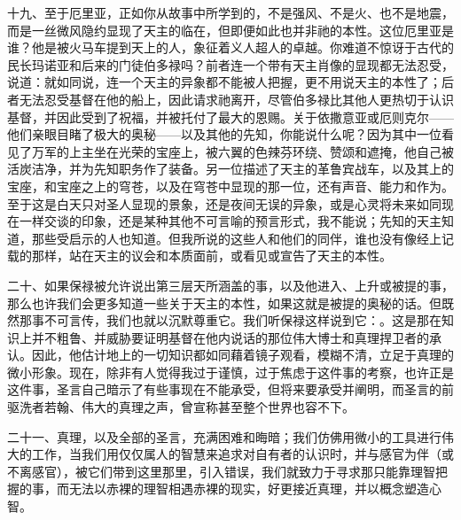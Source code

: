 十九、至于厄里亚，正如你从故事中所学到的，不是强风、不是火、也不是地震，而是一丝微风隐约显现了天主的临在，但即便如此也并非祂的本性。这位厄里亚是谁？他是被火马车提到天上的人，象征着义人超人的卓越。你难道不惊讶于古代的民长玛诺亚和后来的门徒伯多禄吗？前者连一个带有天主肖像的显现都无法忍受，说道：就如同说，连一个天主的异象都不能被人把握，更不用说天主的本性了；后者无法忍受基督在他的船上，因此请求祂离开，尽管伯多禄比其他人更热切于认识基督，并因此受到了祝福，并被托付了最大的恩赐。关于依撒意亚或厄则克尔——他们亲眼目睹了极大的奥秘——以及其他的先知，你能说什么呢？因为其中一位看见了万军的上主坐在光荣的宝座上，被六翼的色辣芬环绕、赞颂和遮掩，他自己被活炭洁净，并为先知职务作了装备。另一位描述了天主的革鲁宾战车，以及其上的宝座，和宝座之上的穹苍，以及在穹苍中显现的那一位，还有声音、能力和作为。至于这是白天只对圣人显现的景象，还是夜间无误的异象，或是心灵将未来如同现在一样交谈的印象，还是某种其他不可言喻的预言形式，我不能说；先知的天主知道，那些受启示的人也知道。但我所说的这些人和他们的同伴，谁也没有像经上记载的那样，站在天主的议会和本质面前，或看见或宣告了天主的本性。\par

二十、如果保禄被允许说出第三层天所涵盖的事，以及他进入、上升或被提的事，那么也许我们会更多知道一些关于天主的本性，如果这就是被提的奥秘的话。但既然那事不可言传，我们也就以沉默尊重它。我们听保禄这样说到它：。这是那在知识上并不粗鲁、并威胁要证明基督在他内说话的那位伟大博士和真理捍卫者的承认。因此，他估计地上的一切知识都如同藉着镜子观看，模糊不清，立足于真理的微小形象。现在，除非有人觉得我过于谨慎，过于焦虑于这件事的考察，也许正是这件事，圣言自己暗示了有些事现在不能承受，但将来要承受并阐明，而圣言的前驱洗者若翰、伟大的真理之声，曾宣称甚至整个世界也容不下。\par

二十一、真理，以及全部的圣言，充满困难和晦暗；我们仿佛用微小的工具进行伟大的工作，当我们用仅仅属人的智慧来追求对自有者的认识时，并与感官为伴（或不离感官），被它们带到这里那里，引入错误，我们就致力于寻求那只能靠理智把握的事，而无法以赤裸的理智相遇赤裸的现实，好更接近真理，并以概念塑造心智。\par

